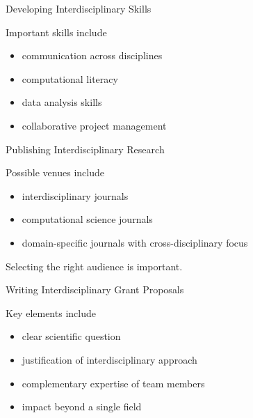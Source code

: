 \documentclass{beamer}
\begin{document}

\begin{frame}{Developing Interdisciplinary Skills}

Important skills include

\begin{itemize}
\item communication across disciplines
\item computational literacy
\item data analysis skills
\item collaborative project management
\end{itemize}

\end{frame}


\begin{frame}{Publishing Interdisciplinary Research}

Possible venues include

\begin{itemize}
\item interdisciplinary journals
\item computational science journals
\item domain-specific journals with cross-disciplinary focus
\end{itemize}

Selecting the right audience is important.

\end{frame}


\begin{frame}{Writing Interdisciplinary Grant Proposals}

Key elements include

\begin{itemize}
\item clear scientific question
\item justification of interdisciplinary approach
\item complementary expertise of team members
\item impact beyond a single field
\end{itemize}


\end{frame}

\end{document}
